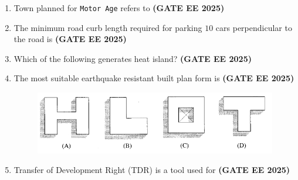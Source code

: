 \documentclass[journal,12pt,onecolumn]{IEEEtran}
\theoremstyle{remark}
\begin{document}
{\begin{enumerate}
\begin{enumerate}
\end{enumerate}
\item Town planned for \texttt{Motor Age} refers to \hfill \textbf{(GATE EE 2025)}
\begin{enumerate}
\end{enumerate}
\item The minimum road curb length required for parking $10$ cars perpendicular to the road is \hfill \textbf{(GATE EE 2025)}
\begin{enumerate}
\end{enumerate}
\item Which of the following generates heat island? \hfill \textbf{(GATE EE 2025)}
\begin{enumerate}
\end{enumerate}
\item The most suitable earthquake resistant built plan form is \hfill \textbf{(GATE EE 2025)}
\begin{figure}[H]
    \centering
    \includegraphics[width=0.5\linewidth]{figs/fig1.png}
    \caption{}
    \label{fig1}
\end{figure}
\item Transfer of Development Right (TDR) is a tool used for \hfill \textbf{(GATE EE 2025)}

\end{enumerate}}
\end{document}
